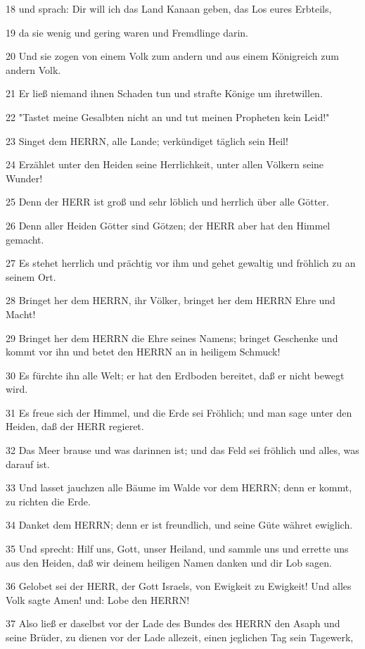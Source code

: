 \par 18 und sprach: Dir will ich das Land Kanaan geben, das Los eures Erbteils,
\par 19 da sie wenig und gering waren und Fremdlinge darin.
\par 20 Und sie zogen von einem Volk zum andern und aus einem Königreich zum andern Volk.
\par 21 Er ließ niemand ihnen Schaden tun und strafte Könige um ihretwillen.
\par 22 "Tastet meine Gesalbten nicht an und tut meinen Propheten kein Leid!"
\par 23 Singet dem HERRN, alle Lande; verkündiget täglich sein Heil!
\par 24 Erzählet unter den Heiden seine Herrlichkeit, unter allen Völkern seine Wunder!
\par 25 Denn der HERR ist groß und sehr löblich und herrlich über alle Götter.
\par 26 Denn aller Heiden Götter sind Götzen; der HERR aber hat den Himmel gemacht.
\par 27 Es stehet herrlich und prächtig vor ihm und gehet gewaltig und fröhlich zu an seinem Ort.
\par 28 Bringet her dem HERRN, ihr Völker, bringet her dem HERRN Ehre und Macht!
\par 29 Bringet her dem HERRN die Ehre seines Namens; bringet Geschenke und kommt vor ihn und betet den HERRN an in heiligem Schmuck!
\par 30 Es fürchte ihn alle Welt; er hat den Erdboden bereitet, daß er nicht bewegt wird.
\par 31 Es freue sich der Himmel, und die Erde sei Fröhlich; und man sage unter den Heiden, daß der HERR regieret.
\par 32 Das Meer brause und was darinnen ist; und das Feld sei fröhlich und alles, was darauf ist.
\par 33 Und lasset jauchzen alle Bäume im Walde vor dem HERRN; denn er kommt, zu richten die Erde.
\par 34 Danket dem HERRN; denn er ist freundlich, und seine Güte währet ewiglich.
\par 35 Und sprecht: Hilf uns, Gott, unser Heiland, und sammle uns und errette uns aus den Heiden, daß wir deinem heiligen Namen danken und dir Lob sagen.
\par 36 Gelobet sei der HERR, der Gott Israels, von Ewigkeit zu Ewigkeit! Und alles Volk sagte Amen! und: Lobe den HERRN!
\par 37 Also ließ er daselbst vor der Lade des Bundes des HERRN den Asaph und seine Brüder, zu dienen vor der Lade allezeit, einen jeglichen Tag sein Tagewerk,
